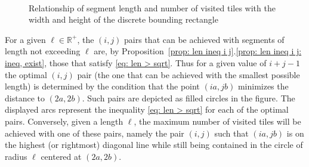 \documentclass[12pt, a4paper]{article}
\newcommand{\len}{\ell} %
\begin{document}
\begin{figure}
\centering%
\\%
\centering%
%
\caption{Relationship of segment length and number of visited tiles with the width and height of the discrete bounding rectangle
}%
\label{fig: ijLS}%
\end{figure}%

For a given $\len \in \mathbb R^+$, the $(i,j)$ pairs that can be achieved with segments of length not exceeding $\len$ are, by Proposition~\ref{prop: len ineq i j}.\ref{prop: len ineq i j: ineq, exist}, those that satisfy \eqref{eq: len > sqrt}. Thus for a given value of $i+j-1$ the optimal $(i,j)$ pair (the one that can be achieved with the smallest possible length) is determined by the condition that the point $(ia,jb)$ minimizes the distance to $(2a,2b)$. Such pairs are depicted as filled circles in the figure. The displayed arcs represent the inequality \eqref{eq: len > sqrt} for each of the optimal pairs. Conversely, given a length $\len$, the maximum number of visited tiles will be achieved with one of these pairs, namely the pair $(i,j)$ such that $(ia,jb)$ is on the highest (or rightmost) diagonal line while still being contained in the circle of radius $\len$ centered at $(2a,2b)$.
\end{document}

